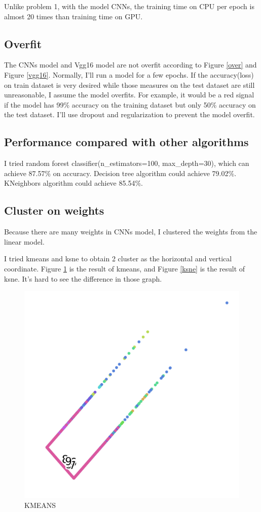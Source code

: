 \documentclass{article}
\begin{document}
Unlike problem 1, with the model CNNs, the training time on CPU per epoch is almost 20 times than training time on GPU. 

\subsection{Overfit}
The CNNs model and Vgg16 model are not overfit according to Figure \ref{over} and  Figure \ref{vgg16}.  Normally, I'll run a model for a few epochs. If the accuracy(loss) on train dataset is very desired while those measures on the test dataset are still unreasonable, I assume the model overfits. For example, it would be a red signal if the model has 99\% accuracy on the training dataset but only 50\% accuracy on the test dataset. I'll use dropout and regularization to prevent the model overfit.


\subsection{Performance compared with other algorithms}
I tried random forest classifier(n\_estimators=100, max\_depth=30), which can achieve 87.57\% on accuracy. Decision tree algorithm could achieve 79.02\%. KNeighbors algorithm could achieve 85.54\%.

\subsection{Cluster on weights}
Because there are many weights in CNNs model, I clustered the weights from the linear model.

I tried kmeans and ksne to obtain 2 cluster as the horizontal and vertical coordinate. Figure \ref{kmean} is the result of kmeans, and Figure \ref{ksne} is the result of ksne. It's hard to see the difference in those graph.

\begin{figure}[!h]
  \centering
  \includegraphics[scale=0.5]{imgs/kmeans.png}
  \caption{KMEANS}
  \label{kmean}
\end{figure}
\end{document}
